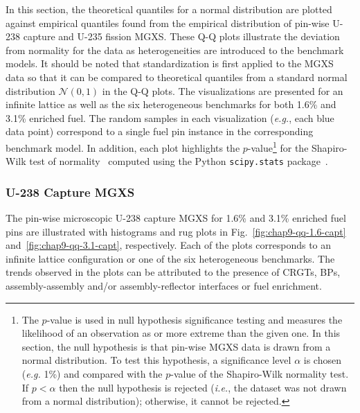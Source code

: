 In this section, the theoretical quantiles for a normal distribution are plotted against empirical quantiles found from the empirical distribution of pin-wise U-238 capture and U-235 fission \ac{MGXS}. These \ac{Q-Q} plots illustrate the deviation from normality for the data as heterogeneities are introduced to the benchmark models. It should be noted that standardization is first applied to the \ac{MGXS} data so that it can be compared to theoretical quantiles from a standard normal distribution $\mathcal{N}(0,1)$ in the \ac{Q-Q} plots. The visualizations are presented for an infinite lattice as well as the six heterogeneous benchmarks for both 1.6\% and 3.1\% enriched fuel. The random samples in each visualization (\textit{e.g.}, each blue data point) correspond to a single fuel pin instance in the corresponding benchmark model. In addition, each plot highlights the $p$-value\footnote{The $p$-value is used in null hypothesis significance testing and measures the likelihood of an observation as or more extreme than the given one. In this section, the null hypothesis is that pin-wise \ac{MGXS} data is drawn from a normal distribution. To test this hypothesis, a significance level $\alpha$ is chosen (\textit{e.g.} 1\%) and compared with the $p$-value of the Shapiro-Wilk normality test. If $p < \alpha$ then the null hypothesis is rejected (\textit{i.e.}, the dataset was not drawn from a normal distribution); otherwise, it cannot be rejected.} for the Shapiro-Wilk test of normality~\cite{shapiro1965analysis} computed using the Python \texttt{scipy.stats} package~\cite{jones2011scipy}.

\subsubsection{U-238 Capture MGXS}
\label{subsubsec:chap9-qq-plots-capt}

The pin-wise microscopic U-238 capture \ac{MGXS} for 1.6\% and 3.1\% enriched fuel pins are illustrated with histograms and rug plots in Fig.~\ref{fig:chap9-qq-1.6-capt} and~\ref{fig:chap9-qq-3.1-capt}, respectively. Each of the plots corresponds to an infinite lattice configuration or one of the six heterogeneous benchmarks. The trends observed in the plots can be attributed to the presence of \acp{CRGT}, \acp{BP}, assembly-assembly and/or assembly-reflector interfaces or fuel enrichment. 

